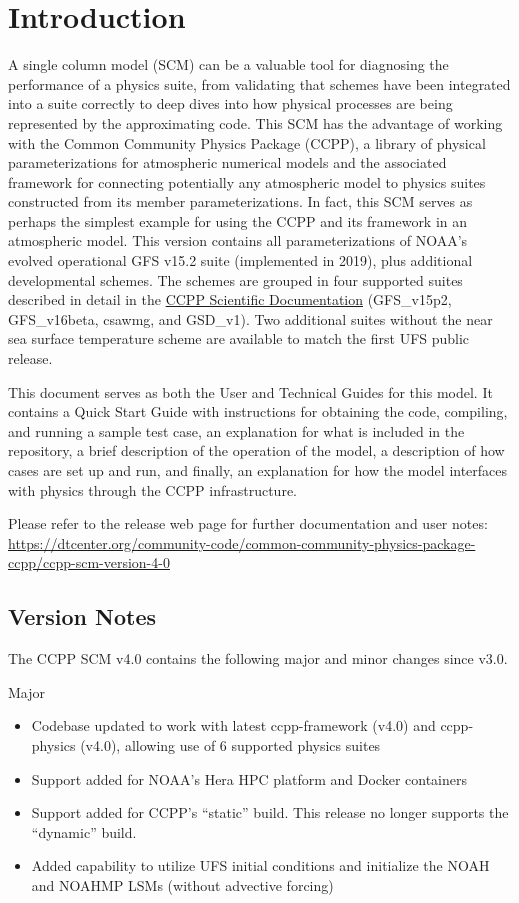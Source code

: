\chapter{Introduction}
\label{chapter: introduction}

A single column model (SCM) can be a valuable tool for diagnosing the performance of a physics suite, from validating that schemes have been integrated into a suite correctly to deep dives into how physical processes are being represented by the approximating code. This SCM has the advantage of working with the Common Community Physics Package (CCPP), a library of physical parameterizations for atmospheric numerical models and the associated framework for connecting potentially any atmospheric model to physics suites constructed from its member parameterizations. In fact, this SCM serves as perhaps the simplest example for using the CCPP and its framework in an atmospheric model. This version contains all parameterizations of NOAA's evolved operational GFS v15.2 suite (implemented in 2019), plus additional developmental schemes. The schemes are grouped in four supported suites described in detail in the \href{https://dtcenter.org/GMTB/v4.0/sci\_doc/}{CCPP Scientific Documentation} (GFS\_v15p2, GFS\_v16beta, csawmg, and GSD\_v1). Two additional suites without the near sea surface temperature scheme are available to match the first UFS public release.

This document serves as both the User and Technical Guides for this model. It contains a Quick Start Guide with instructions for obtaining the code, compiling, and running a sample test case, an explanation for what is included in the repository, a brief description of the operation of the model, a description of how cases are set up and run, and finally, an explanation for how the model interfaces with physics through the CCPP infrastructure.

Please refer to the release web page for further documentation and user notes:\\ \url{https://dtcenter.org/community-code/common-community-physics-package-ccpp/ccpp-scm-version-4-0}

\section{Version Notes}

The CCPP SCM v4.0 contains the following major and minor changes since v3.0.

Major
\begin{itemize}
\item Codebase updated to work with latest ccpp-framework (v4.0) and ccpp-physics (v4.0), allowing use of 6 supported physics suites
\item Support added for NOAA's Hera HPC platform and Docker containers
\item Support added for CCPP's ``static'' build. This release no longer supports the ``dynamic'' build.
\item Added capability to utilize UFS initial conditions and initialize the NOAH and NOAHMP LSMs (without advective forcing)
\end{itemize}

